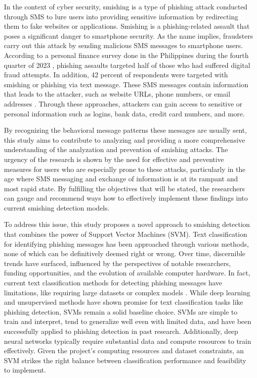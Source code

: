 \documentclass[conference]{IEEEtran}
\begin{document}
In the context of cyber security, smishing is a type of phishing attack conducted through SMS to lure users into providing sensitive information by redirecting them to fake websites or applications. Smishing is a phishing-related assault that poses a significant danger to smartphone security. As the name implies, fraudsters carry out this attack by sending malicious SMS messages to smartphone users. According to a personal finance survey done in the Philippines during the fourth quarter of 2023 \cite{statista2023}, phishing assaults targeted half of those who had suffered digital fraud attempts. In addition, 42 percent of respondents were targeted with smishing or phishing via text message. These SMS messages contain information that leads to the attacker, such as website URLs, phone numbers, or email addresses \cite{mazri2023}. Through these approaches, attackers can gain access to sensitive or personal information such as logins, bank data, credit card numbers, and more.

By recognizing the behavioral message patterns these messages are usually sent, this study aims to contribute to analyzing and providing a more comprehensive understanding of the analyzation and prevention of smishing attacks. The urgency of the research is shown by the need for effective and preventive measures for users who are especially prone to these attacks, particularly in the age where SMS messaging and exchange of information is at its rampant and most rapid state. By fulfilling the objectives that will be stated, the researchers can gauge and recommend ways how to effectively implement these findings into current smishing detection models.

To address this issue, this study proposes a novel approach to smishing detection that combines the power of Support Vector Machines (SVM). Text classification for identifying phishing messages has been approached through various methods, none of which can be definitively deemed right or wrong. Over time, discernible trends have surfaced, influenced by the perspectives of notable researchers, funding opportunities, and the evolution of available computer hardware. In fact, current text classification methods for detecting phishing messages have limitations, like requiring large datasets or complex models \cite{thakur2023}. While deep learning and unsupervised methods have shown promise for text classification tasks like phishing detection, SVMs remain a solid baseline choice. SVMs are simple to train and interpret, tend to generalize well even with limited data, and have been successfully applied to phishing detection in past research. Additionally, deep neural networks typically require substantial data and compute resources to train effectively. Given the project's computing resources and dataset constraints, an SVM strikes the right balance between classification performance and feasibility to implement.
\end{document}

